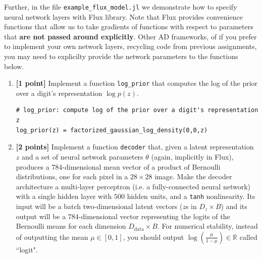 \documentclass{article}
\begin{document}
Further, in the file \texttt{example\_flux\_model.jl} we demonstrate how to specify neural network layers with Flux library.
Note that Flux provides convenience functions that allow us to take gradients of functions with respect to parameters that \textbf{are not passed around explicitly}.
Other AD frameworks, of if you prefer to implement your own network layers, recycling code from previous assignments, you may need to explicilty provide the network parameters to the functions below.

\begin{enumerate}[label=(\alph*)]
	
  \item {\bf [1 point]} Implement a function \texttt{log\_prior} that computes the log of the prior over a digit's representation $\log p(z)$.
  
  \begin{lstlisting}
# log_prior: compute log of the prior over a digit's representation z
log_prior(z) = factorized_gaussian_log_density(0,0,z)
  \end{lstlisting}
	
  \item {\bf [2 points]} Implement a function \texttt{decoder} that, given a latent representation $z$ and a set of neural network parameters $\theta$ (again, implicitly in Flux), produces a 784-dimensional mean vector of a product of Bernoulli distributions, one for each pixel in a $28 \times 28$ image.
	Make the decoder architecture a multi-layer perceptron (i.e. a fully-connected neural network) with a single hidden layer with $500$ hidden units, and a \texttt{tanh} nonlinearity.
  Its input will be a batch two-dimensional latent vectors ($z$s in $D_z \times B$) and its output will be a 784-dimensional vector representing the logits of the Bernoulli means for each dimension $D_\text{data}\times B$.
	For numerical stability, instead of outputting the mean $\mu \in [0,1]$, you should output $\log \left( \frac{\mu}{1 - \mu} \right) \in \mathbb{R}$ called ``logit".
	


\end{enumerate}
\end{document}
